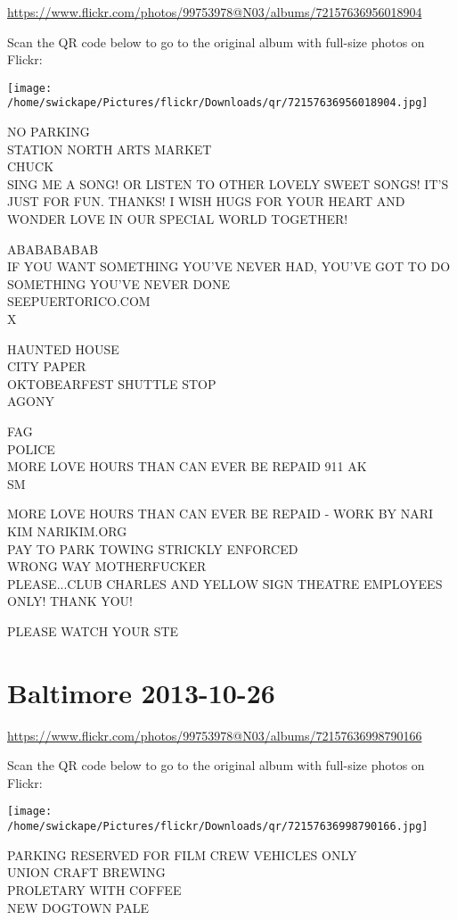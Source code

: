 \documentclass[10pt,letterpaper]{article}
\begin{document}
\url{https://www.flickr.com/photos/99753978@N03/albums/72157636956018904}

Scan the QR code below to go to the original album with full-size photos on Flickr:

\texttt{[image: /home/swickape/Pictures/flickr/Downloads/qr/72157636956018904.jpg]}


NO PARKING\\
STATION NORTH ARTS MARKET\\
CHUCK\\
SING ME A SONG!  OR LISTEN TO OTHER LOVELY SWEET SONGS! IT'S JUST FOR FUN. THANKS! I WISH HUGS FOR YOUR HEART AND WONDER LOVE IN OUR SPECIAL WORLD TOGETHER!

ABABABABAB\\
IF YOU WANT SOMETHING YOU'VE NEVER HAD, YOU'VE GOT TO DO SOMETHING YOU'VE NEVER DONE\\
SEEPUERTORICO.COM\\
X

HAUNTED HOUSE\\
CITY PAPER\\
OKTOBEARFEST SHUTTLE STOP\\
AGONY

FAG\\
POLICE\\
MORE LOVE HOURS THAN CAN EVER BE REPAID 911 AK\\
SM

MORE LOVE HOURS THAN CAN EVER BE REPAID {-} WORK BY NARI KIM NARIKIM.ORG\\
PAY TO PARK TOWING STRICKLY ENFORCED\\
WRONG WAY MOTHERFUCKER\\
PLEASE...CLUB CHARLES AND YELLOW SIGN THEATRE EMPLOYEES ONLY!  THANK YOU!

PLEASE WATCH YOUR STE


\section*{Baltimore 2013-10-26}

\url{https://www.flickr.com/photos/99753978@N03/albums/72157636998790166}

Scan the QR code below to go to the original album with full-size photos on Flickr:

\texttt{[image: /home/swickape/Pictures/flickr/Downloads/qr/72157636998790166.jpg]}


PARKING RESERVED FOR FILM CREW VEHICLES ONLY\\
UNION CRAFT BREWING\\
PROLETARY WITH COFFEE\\
NEW DOGTOWN PALE
\end{document}
